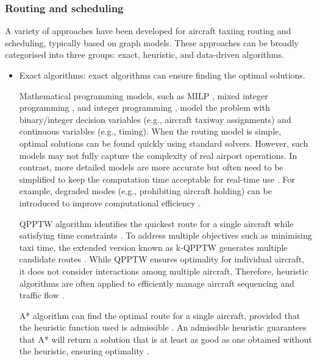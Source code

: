 \documentclass{article}
\begin{document}
\subsubsection{Routing and scheduling}
A variety of approaches have been developed for aircraft taxiing routing and scheduling, typically based on graph models. These approaches can be broadly categorised into three groups: exact, heuristic, and data-driven algorithms.

\begin{itemize}
\item Exact algorithms: exact algorithms can ensure finding the optimal solutions.

Mathematical programming models, such as MILP \cite{roling2008optimal, roling2009airport, clare2011optimization, evertse2017real}, mixed integer programming \cite{smeltink2004optimisation}, and integer programming \cite{zou2018two}, model the problem with binary/integer decision variables (e.g., aircraft taxiway assignments) and continuous variables (e.g., timing). When the routing model is simple, optimal solutions can be found quickly using standard solvers. However, such models may not fully capture the complexity of real airport operations. In contrast, more detailed models are more accurate but often need to be simplified to keep the computation time acceptable for real-time use \cite{clare2011optimization, evertse2017real}. For example, degraded modes (e.g., prohibiting aircraft holding) can be introduced to improve computational efficiency \cite{evertse2017real}. 

QPPTW algorithm identifies the quickest route for a single aircraft while satisfying time constraints \cite{ravizza2014more}. To address multiple objectives such as minimising taxi time, the extended version known as k-QPPTW generates multiple candidate routes \cite{weiszer2014heuristic, weiszer2015real}. While QPPTW ensures optimality for individual aircraft, it does not consider interactions among multiple aircraft. Therefore, heuristic algorithms are often applied to efficiently manage aircraft sequencing and traffic flow \cite{ravizza2014more}.

A* algorithm can find the optimal route for a single aircraft, provided that the heuristic function used is admissible \cite{zhang2018online, brownlee2018rolling, dabachine2018bidirectional, weiszer2020multi}. An admissible heuristic guarantees that A* will return a solution that is at least as good as one obtained without the heuristic, ensuring optimality \cite{weiszer2020multi}.


\end{itemize}
\end{document}
